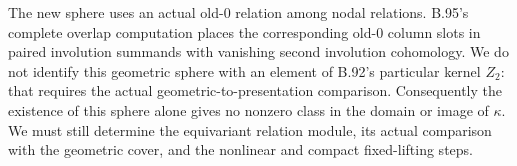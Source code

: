 The new sphere uses an actual old-$0$ relation among nodal
relations.  B.95's complete overlap computation places the
corresponding old-$0$ column slots in paired involution summands
with vanishing second involution cohomology.  We do not identify
this geometric sphere with an element of B.92's particular kernel
$Z_2$: that requires the actual geometric-to-presentation comparison.
Consequently the existence of this sphere alone gives no nonzero
class in the domain or image of $\kappa$.  We must still determine the equivariant relation
module, its actual comparison with the geometric cover, and the
nonlinear and compact fixed-lifting steps.


